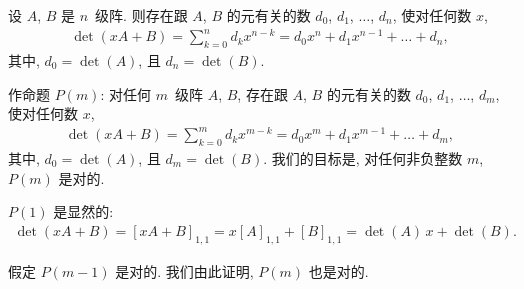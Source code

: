 \documentclass[../libro.tex]{subfiles}
\begin{document}
\begin{example}
    设 \(A\), \(B\) 是 \(n\)~级阵.
    则存在跟 \(A\), \(B\) 的元有关的数
    \(d_0\), \(d_1\), \(\dots\), \(d_n\),
    使对任何数 \(x\),
    \begin{align*}
        \det {(xA + B)}
        = \sum_{k = 0}^{n} {d_k x^{n-k}}
        = d_0 x^n + d_1 x^{n-1} + \dots + d_n,
    \end{align*}
    其中, \(d_0 = \det {(A)}\),
    且 \(d_n = \det {(B)}\).

    作命题 \(P(m)\):
    对任何 \(m\)~级阵 \(A\), \(B\),
    存在跟 \(A\), \(B\) 的元有关的数
    \(d_0\), \(d_1\), \(\dots\), \(d_m\),
    使对任何数 \(x\),
    \begin{align*}
        \det {(xA + B)}
        = \sum_{k = 0}^{m} {d_k x^{m-k}}
        = d_0 x^m + d_1 x^{m-1} + \dots + d_m,
    \end{align*}
    其中, \(d_0 = \det {(A)}\),
    且 \(d_m = \det {(B)}\).
    我们的目标是,
    对任何非负整数 \(m\), \(P(m)\) 是对的.

    \(P(1)\) 是显然的:
    \begin{align*}
        \det {(xA + B)}
        = [xA + B]_{1,1}
        = x [A]_{1,1} + [B]_{1,1}
        = \det {(A)}\, x + \det {(B)}.
    \end{align*}

    假定 \(P(m-1)\) 是对的.
    我们由此证明, \(P(m)\) 也是对的.


\end{example}
\end{document}
